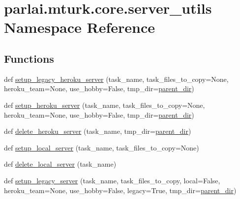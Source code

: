 \hypertarget{namespaceparlai_1_1mturk_1_1core_1_1server__utils}{}\section{parlai.\+mturk.\+core.\+server\+\_\+utils Namespace Reference}
\label{namespaceparlai_1_1mturk_1_1core_1_1server__utils}
\subsection*{Functions}
\begin{DoxyCompactItemize}
\item 
def \hyperlink{namespaceparlai_1_1mturk_1_1core_1_1server__utils_adff2f564896069e0b76ae1b007515a2b}{setup\+\_\+legacy\+\_\+heroku\+\_\+server} (task\+\_\+name, task\+\_\+files\+\_\+to\+\_\+copy=None, heroku\+\_\+team=None, use\+\_\+hobby=False, tmp\+\_\+dir=\hyperlink{namespaceparlai_1_1mturk_1_1core_1_1server__utils_a193439bdbc25a32b00f1a43e6f8532d8}{parent\+\_\+dir})
\item 
def \hyperlink{namespaceparlai_1_1mturk_1_1core_1_1server__utils_af1c97e9b93a403e200ac75b87a51c3c1}{setup\+\_\+heroku\+\_\+server} (task\+\_\+name, task\+\_\+files\+\_\+to\+\_\+copy=None, heroku\+\_\+team=None, use\+\_\+hobby=False, tmp\+\_\+dir=\hyperlink{namespaceparlai_1_1mturk_1_1core_1_1server__utils_a193439bdbc25a32b00f1a43e6f8532d8}{parent\+\_\+dir})
\item 
def \hyperlink{namespaceparlai_1_1mturk_1_1core_1_1server__utils_a8dfde882f9d6ff492ca565ae2334fc70}{delete\+\_\+heroku\+\_\+server} (task\+\_\+name, tmp\+\_\+dir=\hyperlink{namespaceparlai_1_1mturk_1_1core_1_1server__utils_a193439bdbc25a32b00f1a43e6f8532d8}{parent\+\_\+dir})
\item 
def \hyperlink{namespaceparlai_1_1mturk_1_1core_1_1server__utils_a9d4c4937ea60bd74630a44739e825ebf}{setup\+\_\+local\+\_\+server} (task\+\_\+name, task\+\_\+files\+\_\+to\+\_\+copy=None)
\item 
def \hyperlink{namespaceparlai_1_1mturk_1_1core_1_1server__utils_a9b4f4c3f696be001c2fa96b3690af83c}{delete\+\_\+local\+\_\+server} (task\+\_\+name)
\item 
def \hyperlink{namespaceparlai_1_1mturk_1_1core_1_1server__utils_afe9361009645f245de2a07c18cd485bb}{setup\+\_\+legacy\+\_\+server} (task\+\_\+name, task\+\_\+files\+\_\+to\+\_\+copy, local=False, heroku\+\_\+team=None, use\+\_\+hobby=False, legacy=True, tmp\+\_\+dir=\hyperlink{namespaceparlai_1_1mturk_1_1core_1_1server__utils_a193439bdbc25a32b00f1a43e6f8532d8}{parent\+\_\+dir})

\end{DoxyCompactItemize}
